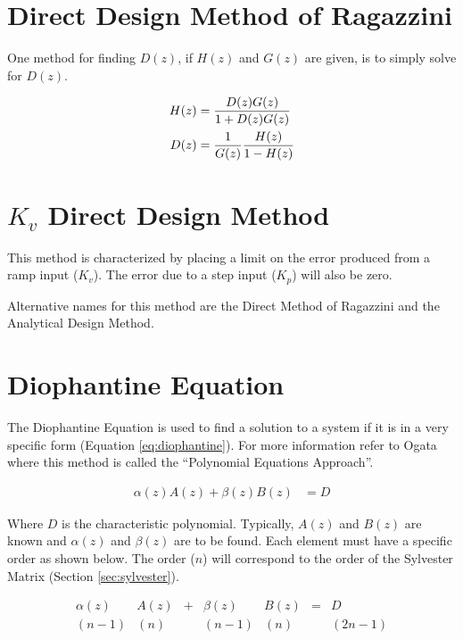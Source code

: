 \documentclass{article}
\begin{document}
\section{Direct Design Method of Ragazzini}

One method for finding $D(z)$, if $H(z)$ and $G(z)$ are given,
is to simply solve for $D(z)$\autocite[Pg. 265]{franklin1998digital}.

\begin{align}
	H(z) &= \frac{D(z)G(z)}{1 + D(z)G(z)} \notag \\
	D(z) &= \frac{1}{G(z)} \frac{H(z)}{1 - H(z)}
\end{align}


\section{$K_v$ Direct Design Method}

This method is characterized by placing a limit on the error
produced from a ramp input ($K_v$).
The error due to a step input ($K_p$) will also be zero.

Alternative names for this method are the Direct Method
of Ragazzini\autocite[Pg. 264]{franklin1998digital} and
the Analytical Design Method\autocite[Pg. 242]{ogata1995discrete}.

\section{Diophantine Equation}

The Diophantine Equation is used to find a solution to a system
if it is in a very specific form (Equation \ref{eq:diophantine}).
For more information refer to Ogata\autocite[Pg. 525]{ogata1995discrete}
where this method is called the ``Polynomial Equations Approach''.

\begin{align}
	\alpha(z)A(z) + \beta(z)B(z) &= D \label{eq:diophantine}
\end{align}

Where $D$ is the characteristic polynomial.
Typically, $A(z)$ and $B(z)$ are known and $\alpha(z)$ and $\beta(z)$
are to be found.
Each element must have a specific order as shown below.
The order ($n$) will correspond to the order of the
Sylvester Matrix (Section \ref{sec:sylvester}).

\[
\begin{array}{ccccccc}
	\alpha(z) &A(z) &+ &\beta(z) &B(z) &= &D \\
	  (n-1)   &(n)  &  & (n-1)  &(n) & &(2n-1)
\end{array}
\]
\end{document}
